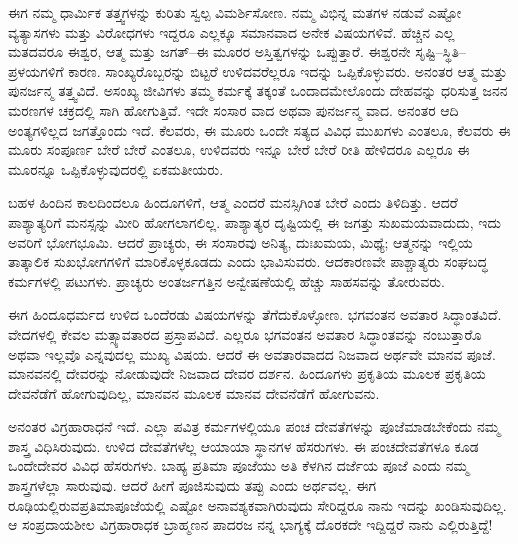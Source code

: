 ಈಗ ನಮ್ಮ ಧಾರ್ಮಿಕ ತತ್ತ್ವಗಳನ್ನು ಕುರಿತು ಸ್ವಲ್ಪ ವಿಮರ್ಶಿಸೋಣ. ನಮ್ಮ ವಿಭಿನ್ನ ಮತಗಳ ನಡುವೆ ಎಷ್ಟೋ ವ್ಯತ್ಯಾಸಗಳು ಮತ್ತು ವಿರೋಧಗಳು ಇದ್ದರೂ ಎಲ್ಲಕ್ಕೂ ಸಮಾನವಾದ ಅನೇಕ ವಿಷಯಗಳಿವೆ. ಹೆಚ್ಚಿನ ಎಲ್ಲ ಮತದವರೂ ಈಶ್ವರ, ಆತ್ಮ ಮತ್ತು ಜಗತ್​–ಈ ಮೂರರ ಅಸ್ತಿತ್ವಗಳನ್ನು ಒಪ್ಪುತ್ತಾರೆ. ಈಶ್ವರನೇ ಸೃಷ್ಟಿ–ಸ್ಥಿತಿ–ಪ್ರಳಯಗಳಿಗೆ ಕಾರಣ. ಸಾಂಖ್ಯರೊಬ್ಬರನ್ನು ಬಿಟ್ಟರೆ ಉಳಿದವರೆಲ್ಲರೂ ಇದನ್ನು ಒಪ್ಪಿಕೊಳ್ಳುವರು. ಅನಂತರ ಆತ್ಮ ಮತ್ತು ಪುನರ್ಜನ್ಮ ತತ್ತ್ವವಿದೆ. ಅಸಂಖ್ಯ ಜೀವಿಗಳು ತಮ್ಮ ಕರ್ಮಕ್ಕೆ ತಕ್ಕಂತೆ ಒಂದಾದಮೇಲೊಂದು ದೇಹವನ್ನು ಧರಿಸುತ್ತ ಜನನ ಮರಣಗಳ ಚಕ್ರದಲ್ಲಿ ಸಾಗಿ ಹೋಗುತ್ತಿವೆ. ಇದೇ ಸಂಸಾರ ವಾದ ಅಥವಾ ಪುನರ್ಜನ್ಮ ವಾದ. ಅನಂತರ ಆದಿ ಅಂತ್ಯಗಳಿಲ್ಲದ ಜಗತ್ತೊಂದು ಇದೆ. ಕೆಲವರು, ಈ ಮೂರು ಒಂದೇ ಸತ್ಯದ ವಿವಿಧ ಮುಖಗಳು ಎಂತಲೂ, ಕೆಲವರು ಈ ಮೂರು ಸಂಪೂರ್ಣ ಬೇರೆ ಬೇರೆ ಎಂತಲೂ, ಉಳಿದವರು ಇನ್ನೂ ಬೇರೆ ಬೇರೆ ರೀತಿ ಹೇಳಿದರೂ ಎಲ್ಲರೂ ಈ ಮೂರನ್ನೂ ಒಪ್ಪಿಕೊಳ್ಳುವುದರಲ್ಲಿ ಏಕಮತೀಯರು. 

ಬಹಳ ಹಿಂದಿನ ಕಾಲದಿಂದಲೂ ಹಿಂದೂಗಳಿಗೆ, ಆತ್ಮ ಎಂದರೆ ಮನಸ್ಸಿಗಿಂತ ಬೇರೆ ಎಂದು ತಿಳಿದಿತ್ತು. ಆದರೆ ಪಾಶ್ಯಾತ್ಯರಿಗೆ ಮನಸ್ಸನ್ನು ಮೀರಿ ಹೋಗಲಾಗಲಿಲ್ಲ. ಪಾಶ್ಯಾತ್ಯರ ದೃಷ್ಟಿಯಲ್ಲಿ ಈ ಜಗತ್ತು ಸುಖಮಯವಾದುದು, ಇದು ಅವರಿಗೆ ಭೋಗಭೂಮಿ. ಆದರೆ ಪ್ರಾಚ್ಯರು, ಈ ಸಂಸಾರವು ಅನಿತ್ಯ, ದುಃಖಮಯ, ಮಿಥ್ಯೆ; ಆತ್ಮನನ್ನು ಇಲ್ಲಿಯ ತಾತ್ಕಾಲಿಕ ಸುಖಭೋಗಗಳಿಗೆ ಮಾರಿಕೊಳ್ಳಕೂಡದು ಎಂದು ಭಾವಿಸುವರು. ಆದಕಾರಣವೇ ಪಾಶ್ಚಾತ್ಯರು ಸಂಘಬದ್ಧ ಕರ್ಮಗಳಲ್ಲಿ ಪಟುಗಳು. ಪ್ರಾಚ್ಯರು ಅಂತರ್ಜಗತ್ತಿನ ಅನ್ವೇಷಣೆಯಲ್ಲಿ ಹೆಚ್ಚು ಸಾಹಸವನ್ನು ತೋರುವರು. 

ಈಗ ಹಿಂದೂಧರ್ಮದ ಉಳಿದ ಒಂದೆರಡು ವಿಷಯಗಳನ್ನು ತೆಗೆದು\-\break ಕೊಳ್ಳೋಣ. ಭಗವಂತನ ಅವತಾರ ಸಿದ್ಧಾಂತವಿದೆ. ವೇದಗಳಲ್ಲಿ ಕೇವಲ ಮತ್ಸ್ಯಾವತಾರದ ಪ್ರಸ್ತಾಪವಿದೆ. ಎಲ್ಲರೂ ಭಗವಂತನ ಅವತಾರ ಸಿದ್ಧಾಂತವನ್ನು ನಂಬುತ್ತಾರೊ ಅಥವಾ ಇಲ್ಲವೊ ಎನ್ನವುದಲ್ಲ ಮುಖ್ಯ ವಿಷಯ. ಆದರೆ ಈ ಅವತಾರವಾದದ ನಿಜವಾದ ಅರ್ಥವೇ ಮಾನವ ಪೂಜೆ. ಮಾನವನಲ್ಲಿ ದೇವರನ್ನು ನೋಡುವುದೇ ನಿಜವಾದ ದೇವರ ದರ್ಶನ. ಹಿಂದೂಗಳು ಪ್ರಕೃತಿಯ ಮೂಲಕ ಪ್ರಕೃತಿಯ ದೇವನೆಡೆಗೆ ಹೋಗುವುದಿಲ್ಲ, ಮಾನವನ ಮೂಲಕ ಮಾನವ ದೇವನೆಡೆಗೆ ಹೋಗುವನು. 

ಅನಂತರ ವಿಗ್ರಹಾರಾಧನೆ ಇದೆ. ಎಲ್ಲಾ ಪವಿತ್ರ ಕರ್ಮಗಳಲ್ಲಿಯೂ ಪಂಚ ದೇವತೆಗಳನ್ನು ಪೂಜೆಮಾಡಬೇಕೆಂದು ನಮ್ಮ ಶಾಸ್ತ್ರ ವಿಧಿಸಿರುವುದು. ಉಳಿದ ದೇವತೆಗಳೆಲ್ಲ ಆಯಾಯಾ ಸ್ಥಾನಗಳ ಹೆಸರುಗಳು. ಈ ಪಂಚದೇವತೆಗಳೂ ಕೂಡ ಒಂದೇದೇವರ ವಿವಿಧ ಹೆಸರುಗಳು. ಬಾಹ್ಯ ಪ್ರತಿಮಾ ಪೂಜೆಯು ಅತಿ ಕೆಳಗಿನ ದರ್ಜೆಯ ಪೂಜೆ ಎಂದು ನಮ್ಮ ಶಾಸ್ತ್ರಗಳೆಲ್ಲಾ ಸಾರುವುವು. ಆದರೆ ಹೀಗೆ ಪೂಜಿಸುವುದು ತಪ್ಪು ಎಂದು ಅರ್ಥವಲ್ಲ. ಈಗ ರೂಢಿಯಲ್ಲಿರುವ\break ಪ್ರತಿಮಾಪೂಜೆಯಲ್ಲಿ ಎಷ್ಟೋ ಅನಾವಶ್ಯಕವಾಗಿರುವುದು ಸೇರಿದ್ದರೂ ನಾನು ಇದನ್ನು ಖಂಡಿಸುವುದಿಲ್ಲ. ಆ ಸಂಪ್ರದಾಯಶೀಲ ವಿಗ್ರಹಾರಾಧಕ ಬ್ರಾಹ್ಮಣನ ಪಾದರಜ ನನ್ನ ಭಾಗ್ಯಕ್ಕೆ ದೊರಕದೇ ಇದ್ದಿದ್ದರೆ ನಾನು ಎಲ್ಲಿರುತ್ತಿದ್ದೆ!

